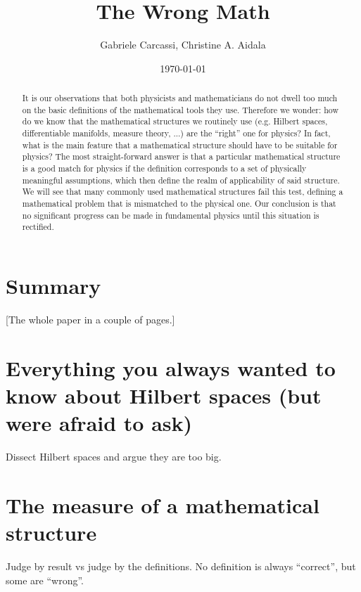 \documentclass[10pt,twocolumn, nofootinbib]{revtex4-2}
\begin{document}
\title{The Wrong Math}
\author{Gabriele Carcassi, Christine A. Aidala}

\date{\today}


\begin{abstract}
It is our observations that both physicists and mathematicians do not dwell too much on the basic definitions of the mathematical tools they use. Therefore we wonder: how do we know that the mathematical structures we routinely use (e.g. Hilbert spaces, differentiable manifolds, measure theory, ...) are the ``right'' one for physics? 
In fact, what is the main feature that a mathematical structure should have to be suitable for physics? The most straight-forward answer is that a particular mathematical structure is a good match for physics if the definition corresponds to a set of physically meaningful assumptions, which then define the realm of applicability of said structure. We will see that many commonly used mathematical structures fail this test, defining a mathematical problem that is mismatched to the physical one. Our conclusion is that no significant progress can be made in fundamental physics until this situation is rectified.
\end{abstract}

\maketitle

\section{Summary}

[The whole paper in a couple of pages.]

\section{Everything you always wanted to know about Hilbert spaces (but were afraid to ask)}

Dissect Hilbert spaces and argue they are too big.

\section{The measure of a mathematical structure}

Judge by result vs judge by the definitions. No definition is always ``correct'', but some are ``wrong''.
\end{document}
